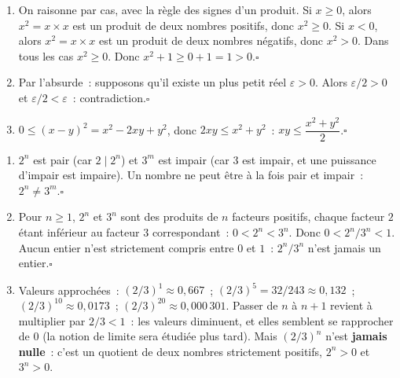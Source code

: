 
\begin{enumerate}
  \item On raisonne par cas, avec la r\`egle des signes d'un produit.
        Si $x\geq0$, alors $x^2=x\times x$ est un produit de deux nombres positifs, donc $x^2\geq0$.
        Si $x<0$, alors $x^2=x\times x$ est un produit de deux nombres n\'egatifs, donc $x^2>0$.
        Dans tous les cas $x^2\geq0$.
        Donc $x^2+1\geq0+1=1>0$.\hfill$\square$
  \item Par l'absurde~: supposons qu'il existe un plus petit r\'eel $\varepsilon>0$.
        Alors $\varepsilon/2>0$ et $\varepsilon/2<\varepsilon$~: contradiction.\hfill$\square$
  \item $0\leq(x-y)^2=x^2-2xy+y^2$, donc $2xy\leq x^2+y^2$~:
        $xy\leq\dfrac{x^2+y^2}{2}$.\hfill$\square$
\end{enumerate}


\begin{enumerate}
  \item $2^n$ est pair (car $2\mid2^n$) et $3^m$ est impair (car $3$ est impair,
        et une puissance d'impair est impaire). Un nombre ne peut \^etre
        \`a la fois pair et impair~: $2^n\ne3^m$.\hfill$\square$
  \item Pour $n\geq1$, $2^n$ et $3^n$ sont des produits de $n$ facteurs positifs,
        chaque facteur $2$ \'etant inf\'erieur au facteur $3$ correspondant~: $0<2^n<3^n$.
        Donc $0<2^n/3^n<1$. Aucun entier n'est strictement compris entre $0$ et $1$~:
        $2^n/3^n$ n'est jamais un entier.\hfill$\square$
  \item Valeurs approch\'ees~: $(2/3)^1\approx0{,}667$~; $(2/3)^5=32/243\approx0{,}132$~;
        $(2/3)^{10}\approx0{,}0173$~; $(2/3)^{20}\approx0{,}000\,301$.
        Passer de $n$ \`a $n+1$ revient \`a multiplier par $2/3<1$~: les valeurs diminuent,
        et elles semblent se rapprocher de $0$ (la notion de limite sera \'etudi\'ee plus tard).
        Mais $(2/3)^n$ n'est \textbf{jamais nulle}~: c'est un quotient de deux nombres
        strictement positifs, $2^n>0$ et $3^n>0$.
\end{enumerate}


